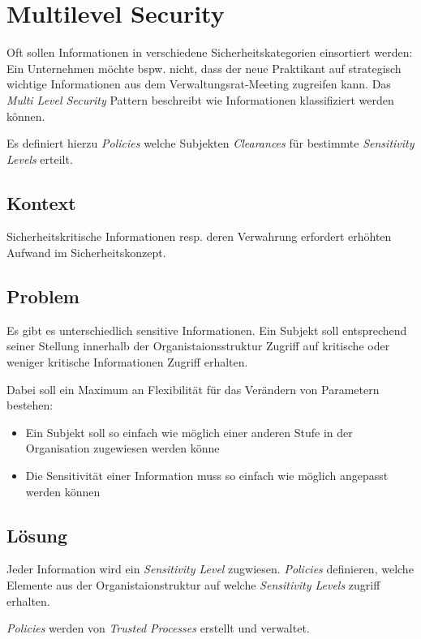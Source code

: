 \section{Multilevel Security}

Oft sollen Informationen in verschiedene Sicherheitskategorien einsortiert werden: Ein Unternehmen möchte bspw. nicht, dass der neue Praktikant auf strategisch wichtige Informationen aus dem Verwaltungsrat-Meeting zugreifen kann. Das \emph{Multi Level Security} Pattern beschreibt wie Informationen klassifiziert werden können.

Es definiert hierzu \emph{Policies} welche Subjekten \emph{Clearances} für bestimmte \emph{Sensitivity Levels} erteilt.


\subsection*{Kontext}
Sicherheitskritische Informationen resp. deren Verwahrung erfordert erhöhten Aufwand im Sicherheitskonzept.

\subsection*{Problem}
Es gibt es unterschiedlich sensitive Informationen. Ein Subjekt soll entsprechend seiner Stellung innerhalb der Organistaionsstruktur Zugriff auf kritische oder weniger kritische Informationen Zugriff erhalten.

Dabei soll ein Maximum an Flexibilität für das Verändern von Parametern bestehen:
\begin{itemize}
	\item Ein Subjekt soll so einfach wie möglich einer anderen Stufe in der Organisation zugewiesen werden könne
	\item Die Sensitivität einer Information muss so einfach wie möglich angepasst werden können
\end{itemize}

\subsection*{Lösung}
Jeder Information wird ein \emph{Sensitivity Level} zugwiesen. \emph{Policies} definieren, welche Elemente aus der Organistaionstruktur auf welche \emph{Sensitivity Levels} zugriff erhalten.

\emph{Policies} werden von \emph{Trusted Processes} erstellt und verwaltet. 



